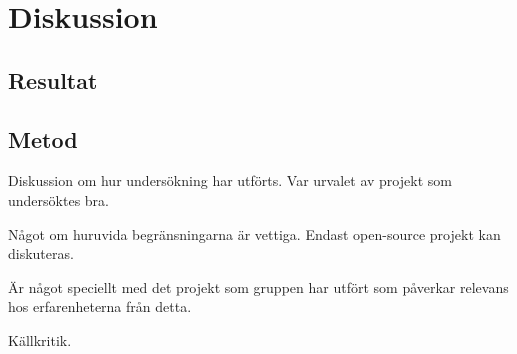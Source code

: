 \section{Diskussion}
\label{sec:joel_a-discussion}

\subsection{Resultat}
\label{subsec:tim-discussion-results}

\subsection{Metod}
\label{subsec:joel_a-discussion-method}
Diskussion om hur undersökning har utförts. Var urvalet av projekt som undersöktes bra.

Något om huruvida begränsningarna är vettiga. Endast open-source projekt kan diskuteras.

Är något speciellt med det projekt som gruppen har utfört som påverkar relevans hos erfarenheterna från detta.

Källkritik.
